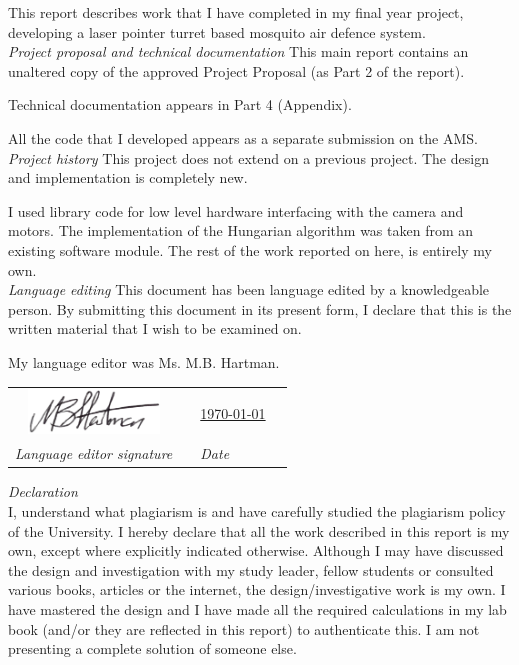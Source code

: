 
This report describes work that I have completed in my final year project, developing a laser pointer turret based mosquito air defence system.
\\[2ex]
\textit{Project proposal and technical documentation} \newline
This main report contains an unaltered copy of the approved Project Proposal (as Part 2 of the report).

Technical documentation appears in Part 4 (Appendix).

All the code that I developed appears as a separate submission on the AMS.
\\[2ex]
\textit{Project history} \newline
This project does not extend on a previous project. The design and implementation is completely new.

I used library code for low level hardware interfacing with the camera and motors. The implementation of the Hungarian algorithm was taken from an existing software module. The rest of the work reported on here, is entirely my own.
\\[2ex]
\textit{Language editing} \newline
This document has been language edited by a knowledgeable person. By submitting this document in its present form, I declare that this is the written material that I wish to be examined on.

My language editor was Ms. M.B. Hartman.

\vspace*{0.5cm}

\begin{tabular}{cp{4cm}ll}
  \includegraphics[width=3.5cm]{figures/mich_handtekening.png} &  & \underline{\today} \\
  \textit{Language editor signature}                           &  & \textit{Date}
\end{tabular}

\vspace*{0.5cm}

\textit{Declaration}
\\[2ex]
I, \underline{\eprthecandidatename} understand what plagiarism is and have carefully studied the plagiarism policy of the University. I hereby declare that all the work described in this report is my own, except where explicitly indicated otherwise. Although I may have discussed the design and investigation with my study leader, fellow students or consulted various books, articles or the internet, the design/investigative work is my own. I have mastered the design and I have made all the required calculations in my lab book (and/or they are reflected in this report) to authenticate this. I am not presenting a complete solution of someone else.

